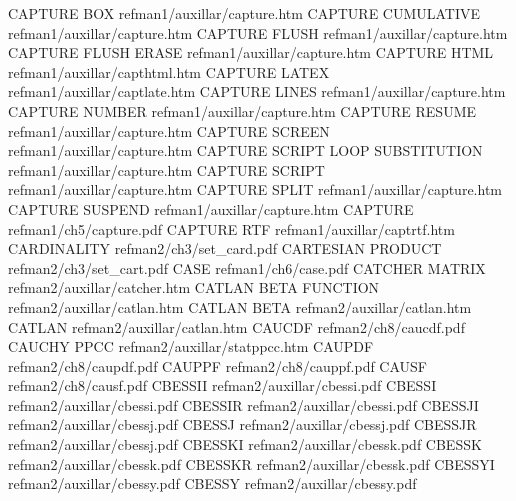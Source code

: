 CAPTURE BOX                             refman1/auxillar/capture.htm
CAPTURE CUMULATIVE                      refman1/auxillar/capture.htm
CAPTURE FLUSH                           refman1/auxillar/capture.htm
CAPTURE FLUSH ERASE                     refman1/auxillar/capture.htm
CAPTURE HTML                            refman1/auxillar/capthtml.htm
CAPTURE LATEX                           refman1/auxillar/captlate.htm
CAPTURE LINES                           refman1/auxillar/capture.htm
CAPTURE NUMBER                          refman1/auxillar/capture.htm
CAPTURE RESUME                          refman1/auxillar/capture.htm
CAPTURE SCREEN                          refman1/auxillar/capture.htm
CAPTURE SCRIPT LOOP SUBSTITUTION        refman1/auxillar/capture.htm
CAPTURE SCRIPT                          refman1/auxillar/capture.htm
CAPTURE SPLIT                           refman1/auxillar/capture.htm
CAPTURE SUSPEND                         refman1/auxillar/capture.htm
CAPTURE                                 refman1/ch5/capture.pdf
CAPTURE RTF                             refman1/auxillar/captrtf.htm
CARDINALITY                             refman2/ch3/set_card.pdf
CARTESIAN PRODUCT                       refman2/ch3/set_cart.pdf
CASE                                    refman1/ch6/case.pdf
CATCHER MATRIX                          refman2/auxillar/catcher.htm
CATLAN BETA FUNCTION                    refman2/auxillar/catlan.htm
CATLAN BETA                             refman2/auxillar/catlan.htm
CATLAN                                  refman2/auxillar/catlan.htm
CAUCDF                                  refman2/ch8/caucdf.pdf
CAUCHY PPCC                             refman2/auxillar/statppcc.htm
CAUPDF                                  refman2/ch8/caupdf.pdf
CAUPPF                                  refman2/ch8/cauppf.pdf
CAUSF                                   refman2/ch8/causf.pdf
CBESSII                                 refman2/auxillar/cbessi.pdf
CBESSI                                  refman2/auxillar/cbessi.pdf
CBESSIR                                 refman2/auxillar/cbessi.pdf
CBESSJI                                 refman2/auxillar/cbessj.pdf
CBESSJ                                  refman2/auxillar/cbessj.pdf
CBESSJR                                 refman2/auxillar/cbessj.pdf
CBESSKI                                 refman2/auxillar/cbessk.pdf
CBESSK                                  refman2/auxillar/cbessk.pdf
CBESSKR                                 refman2/auxillar/cbessk.pdf
CBESSYI                                 refman2/auxillar/cbessy.pdf
CBESSY                                  refman2/auxillar/cbessy.pdf
